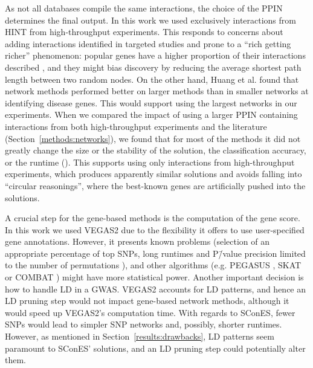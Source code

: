 \documentclass[10pt,letterpaper]{article}
\begin{document}
As not all databases compile the same interactions, the choice of the PPIN determines the final output. In this work we used exclusively interactions from HINT from high-throughput experiments. This responds to concerns about adding interactions identified in targeted studies and prone to a ``rich getting richer'' phenomenon: popular genes have a higher proportion of their interactions described \cite{cai_broker_2010,das_hint:_2012}, and they might bias discovery by reducing the average shortest path length between two random nodes. On the other hand, Huang et al. \cite{huang_systematic_2018} found that network methods performed better on larger methods than in smaller networks at identifying disease genes. This would support using the largest networks in our experiments. When we compared the impact of using a larger PPIN containing interactions from both high-throughput experiments and the literature (Section~\ref{methods:networks}), we found that for most of the methods it did not greatly change the size or the stability of the solution, the classification accuracy, or the runtime (). This supports using only interactions from high-throughput experiments, which produces apparently similar solutions and avoids falling into ``circular reasonings'', where the best-known genes are artificially pushed into the solutions. 

A crucial step for the gene-based methods is the computation of the gene score. In this work we used VEGAS2 \cite{mishra_vegas2:_2015} due to the flexibility it offers to use user-specified gene annotations. However, it presents known problems (selection of an appropriate percentage of top SNPs, long runtimes and P\=/value precision limited to the number of permutations \cite{nakka_gene_2016}), and other algorithms (e.g. PEGASUS \cite{nakka_gene_2016}, SKAT \cite{ionita-laza_sequence_2013} or COMBAT \cite{wang_combat:_2017}) might have more statistical power. Another important decision is how to handle LD in a GWAS. VEGAS2 accounts for LD patterns, and hence an LD pruning step would not impact gene-based network methods, although it would speed up VEGAS2's computation time. With regards to SConES, fewer SNPs would lead to simpler SNP networks and, possibly, shorter runtimes. However, as mentioned in Section~\ref{results:drawbacks}, LD patterns seem paramount to SConES' solutions, and an LD pruning step could potentially alter them. 
\end{document}
